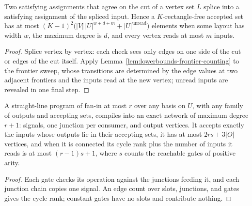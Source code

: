 \begin{lemma}
  \label{lem:lowerbounds-frontier-network-counting}
  \leanok
  Two satisfying assignments that agree on the cut of a vertex set $L$ splice
  into a satisfying assignment of the spliced input. Hence a $K$-rectangle-free
  accepted set has at most
  $(K-1)^2\bigl(|V|\,|U|^{w+d+m}+|U|^{\text{unread}}\bigr)$ elements when some
  layout has width $w$, the maximum degree is $d$, and every vertex reads at most
  $m$ inputs.
\end{lemma}
\begin{proof}
  \leanok
  Splice vertex by vertex: each check sees only edges on one side of the cut or
  edges of the cut itself. Apply Lemma~\ref{lem:lowerbounds-frontier-counting} to
  the frontier sweep, whose transitions are determined by the edge values at two
  adjacent frontiers and the inputs read at the new vertex; unread inputs are
  revealed in one final step.
\end{proof}

\begin{theorem}
  \label{thm:lowerbounds-frontier-compiler}
  \leanok
  A straight-line program of fan-in at most $r$ over any basis on $U$, with any
  family of outputs and accepting sets, compiles into an exact network of
  maximum degree $r+1$: signals, one junction per consumer, and output
  vertices. It accepts exactly the inputs whose outputs lie in their accepting
  sets, it has at most $2rs+3|O|$ vertices, and when it is connected its cycle
  rank plus the number of inputs it reads is at most $(r-1)s+1$, where $s$ counts
  the reachable gates of positive arity.
\end{theorem}
\begin{proof}
  \leanok
  Each gate checks its operation against the junctions feeding it, and each
  junction chain copies one signal. An edge count over slots, junctions, and
  gates gives the cycle rank; constant gates have no slots and contribute
  nothing.
\end{proof}

